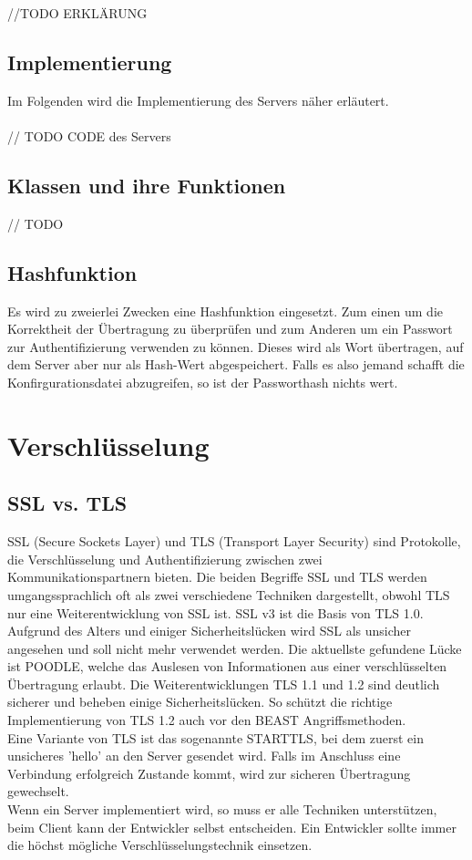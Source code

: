 //TODO ERKLÄRUNG

\subsection{Implementierung}
Im Folgenden wird die Implementierung des Servers näher erläutert. \\\\
	
	// TODO CODE des Servers

\subsection{Klassen und ihre Funktionen}
// TODO
\subsection{Hashfunktion}
Es wird zu zweierlei Zwecken eine Hashfunktion eingesetzt. Zum einen um die Korrektheit der Übertragung zu überprüfen und zum Anderen um ein Passwort zur Authentifizierung verwenden zu können. Dieses wird als Wort übertragen, auf dem Server aber nur als Hash-Wert abgespeichert. Falls es also jemand schafft die Konfirgurationsdatei abzugreifen, so ist der Passworthash nichts wert. 

\section{Verschlüsselung}
\subsection{SSL vs. TLS}
SSL (Secure Sockets Layer) und TLS (Transport Layer Security) sind Protokolle, die Verschlüsselung und Authentifizierung zwischen zwei Kommunikationspartnern bieten. Die beiden Begriffe SSL und TLS werden umgangssprachlich oft als zwei verschiedene Techniken dargestellt, obwohl TLS nur eine Weiterentwicklung von SSL ist. SSL v3 ist die Basis von TLS 1.0. \\
Aufgrund des Alters und einiger Sicherheitslücken wird SSL als unsicher angesehen und soll nicht mehr verwendet werden. Die aktuellste gefundene Lücke ist POODLE, welche das Auslesen von Informationen aus einer verschlüsselten Übertragung erlaubt. Die Weiterentwicklungen TLS 1.1 und 1.2 sind deutlich sicherer und beheben einige Sicherheitslücken. So schützt die richtige Implementierung von TLS 1.2 auch vor den BEAST Angriffsmethoden.\\
Eine Variante von TLS ist das sogenannte STARTTLS, bei dem zuerst ein unsicheres 'hello' an den Server gesendet wird. Falls im Anschluss eine Verbindung erfolgreich Zustande kommt, wird zur sicheren Übertragung gewechselt. \\
Wenn ein Server implementiert wird, so muss er alle Techniken unterstützen, beim Client kann der Entwickler selbst entscheiden. Ein Entwickler sollte immer die höchst mögliche Verschlüsselungstechnik einsetzen. \\

